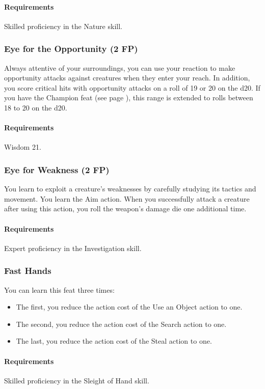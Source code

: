     \paragraph{Requirements} Skilled proficiency in the Nature skill.
\subsubsection{Eye for the Opportunity (2 FP)} \label{feat::eyefortheopportunity}
    Always attentive of your surroundings, you can use your reaction to make opportunity attacks against creatures when they enter your reach.
    In addition, you score critical hits with opportunity attacks on a roll of 19 or 20 on the d20.
    If you have the Champion feat (see page \pageref{feat::champion}), this range is extended to rolls between 18 to 20 on the d20.
    \paragraph{Requirements} Wisdom 21.
\subsubsection{Eye for Weakness (2 FP)} \label{feat::eyeforweakness}
    You learn to exploit a creature's weaknesses by carefully studying its tactics and movement.
    You learn the Aim action.
    When you successfully attack a creature after using this action, you roll the weapon's damage die one additional time.
    \paragraph{Requirements} Expert proficiency in the Investigation skill.
\subsubsection{Fast Hands} \label{feat::fasthands}
    You can learn this feat three times:
    \begin{itemize}
        \item The first, you reduce the action cost of the Use an Object action to one.
        \item The second, you reduce the action cost of the Search action to one.
        \item The last, you reduce the action cost of the Steal action to one.
    \end{itemize}
    \paragraph{Requirements} Skilled proficiency in the Sleight of Hand skill.

